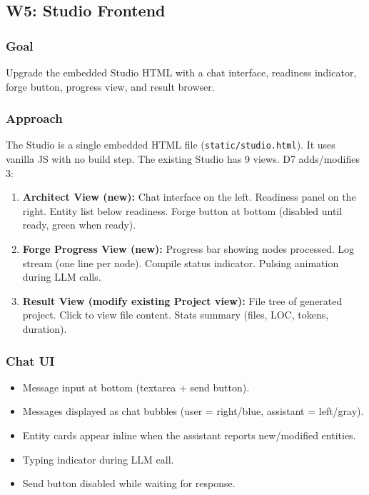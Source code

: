 \documentclass[11pt,a4paper]{article}
\begin{document}
\subsection{W5: Studio Frontend}
\label{sec:w5}

\subsubsection{Goal}

Upgrade the embedded Studio HTML with a chat interface, readiness 
indicator, forge button, progress view, and result browser.

\subsubsection{Approach}

The Studio is a single embedded HTML file 
(\texttt{static/studio.html}). It uses vanilla JS with no build 
step. The existing Studio has 9 views. D7 adds/modifies 3:

\begin{enumerate}[nosep]
\item \textbf{Architect View (new):} Chat interface on the left. 
      Readiness panel on the right. Entity list below readiness. 
      Forge button at bottom (disabled until ready, green when 
      ready).
\item \textbf{Forge Progress View (new):} Progress bar showing 
      nodes processed. Log stream (one line per node). Compile 
      status indicator. Pulsing animation during LLM calls.
\item \textbf{Result View (modify existing Project view):} File 
      tree of generated project. Click to view file content. 
      Stats summary (files, LOC, tokens, duration).
\end{enumerate}

\subsubsection{Chat UI}

\begin{itemize}[nosep]
\item Message input at bottom (textarea + send button).
\item Messages displayed as chat bubbles (user = right/blue, 
      assistant = left/gray).
\item Entity cards appear inline when the assistant reports 
      new/modified entities.
\item Typing indicator during LLM call.
\item Send button disabled while waiting for response.
\end{itemize}
\end{document}

